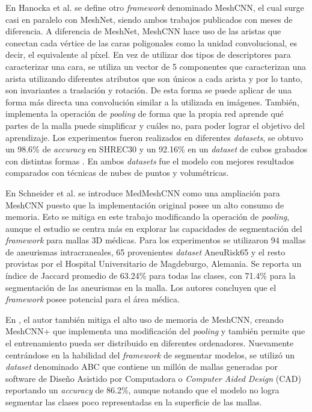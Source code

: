 En Hanocka et al. \cite{hanocka2019meshcnn} se define otro \textit{framework} denominado MeshCNN, el cual surge casi en paralelo con MeshNet, siendo ambos trabajos publicados con meses de diferencia. A diferencia de MeshNet, MeshCNN hace uso de las aristas que conectan cada vértice de las caras poligonales como la unidad convolucional, es decir, el equivalente al píxel. En vez de utilizar dos tipos de descriptores para caracterizar una cara, se utiliza un vector de 5 componentes que caracterizan una arista utilizando diferentes atributos que son únicos a cada arista y por lo tanto, son invariantes a traslación y rotación. De esta forma se puede aplicar de una forma más directa una convolución similar a la utilizada en imágenes. También, implementa la operación de \textit{pooling} de forma que la propia red aprende qué partes de la malla puede simplificar y cuáles no, para poder lograr el objetivo del aprendizaje. Los experimentos fueron realizados en diferentes \textit{datasets}, se obtuvo un 98.6\%  de \textit{accuracy} en SHREC30 \cite{lian2011shape} y un 92.16\% en un \textit{dataset} de cubos grabados con distintas formas \cite{latecki2000shape}. En ambos \textit{datasets} fue el modelo con mejores resultados comparados con técnicas de nubes de puntos y volumétricas.

En Schneider et al. \cite{schneider_medmeshcnn_2021} se introduce MedMeshCNN como una ampliación para MeshCNN puesto que la implementación original posee un alto consumo de memoria. Esto se mitiga en este trabajo modificando la operación de \textit{pooling}, aunque el estudio se centra más en explorar las capacidades de segmentación del \textit{framework} para mallas 3D médicas. Para los experimentos se utilizaron 94 mallas de aneurismas intracraneales, 65 provenientes \textit{dataset} AneuRisk65 \cite{sangalli2014aneurisk65} y el resto provistas por el Hospital Universitario de Magdeburgo, Alemania. Se reporta un índice de Jaccard promedio de 63.24\% para todas las clases, con 71.4\% para la segmentación de las aneurismas en la malla. Los autores concluyen que el \textit{framework} posee potencial para el área médica. 

En \cite{mandado_surface_2021}, el autor también mitiga el alto uso de memoria de MeshCNN, creando MeshCNN+ que implementa una modificación del \textit{pooling} y también permite que el entrenamiento pueda ser distribuido en diferentes ordenadores. Nuevamente centrándose en la habilidad del \textit{framework} de segmentar modelos, se utilizó un \textit{dataset} denominado ABC \cite{Koch_2019_CVPR} que contiene un millón de mallas generadas por software de Diseño Asistido por Computadora o \textit{Computer Aided Design} (CAD) reportando un \textit{accuracy} de 86.2\%, aunque notando que el modelo no logra segmentar las clases poco representadas en la superficie de las mallas.